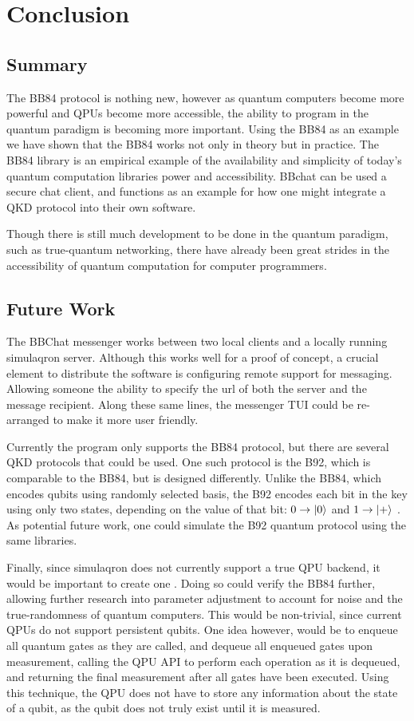 \chapter{Conclusion}
\label{chap:conclusion}

\section{Summary}
The BB84 protocol is nothing new, however as quantum computers become more powerful and QPUs become more accessible, the ability to program in the quantum paradigm is becoming more important.
Using the BB84 as an example we have shown that the BB84 works not only in theory but in practice.
The BB84 library is an empirical example of the availability and simplicity of today's quantum computation libraries power and accessibility.
BBchat can be used a secure chat client, and functions as an example for how one might integrate a QKD protocol into their own software.

Though there is still much development to be done in the quantum paradigm, such as true-quantum networking, there have already been great strides in the accessibility of quantum computation for computer programmers.

\section{Future Work}
The BBChat messenger works between two local clients and a locally running simulaqron server.
Although this works well for a proof of concept, a crucial element to distribute the software is configuring remote support for messaging. 
Allowing someone the ability to specify the url of both the server and the message recipient.
Along these same lines, the messenger TUI could be re-arranged to make it more user friendly.

Currently the program only supports the BB84 protocol, but there are several QKD protocols that could be used.
One such protocol is the B92, which is comparable to the BB84, but is designed differently. 
Unlike the BB84, which encodes qubits using randomly selected basis, the B92 encodes each bit in the key using only two states, depending on the value of that bit: $0 \rightarrow \ket{0}$ and $1 \rightarrow \ket{+}$ \cite{qc:agi}.
As potential future work, one could simulate the B92 quantum protocol using the same libraries.

Finally, since simulaqron does not currently support a true QPU backend, it would be important to create one \cite{simulaqron}.
Doing so could verify the BB84 further, allowing further research into parameter adjustment to account for noise and the true-randomness of quantum computers. 
This would be non-trivial, since current QPUs do not support persistent qubits.
One idea however, would be to enqueue all quantum gates as they are called, and dequeue all enqueued gates upon measurement, calling the QPU API to perform each operation as it is dequeued, and returning the final measurement after all gates have been executed.
Using this technique, the QPU does not have to store any information about the state of a qubit, as the qubit does not truly exist until it is measured.
